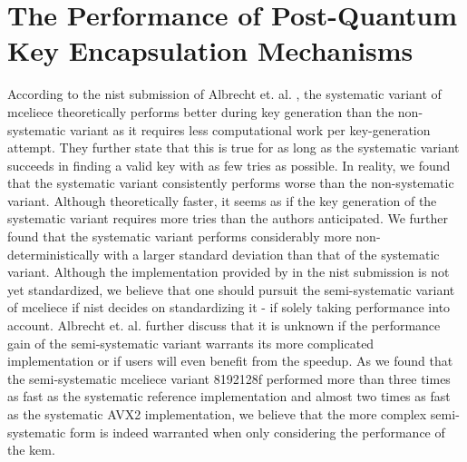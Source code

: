 
\section{The Performance of Post-Quantum Key Encapsulation Mechanisms}

According to the \gls{nist} submission of Albrecht et. al. \cite{mceliece2020}, the systematic variant of \gls{mceliece} theoretically performs better during key generation than the non-systematic variant as it requires less computational work per key-generation attempt. They further state that this is true for as long as the systematic variant succeeds in finding a valid key with as few tries as possible. In reality, we found that the systematic variant consistently performs worse than the non-systematic variant. Although theoretically faster, it seems as if the key generation of the systematic variant requires more tries than the authors anticipated. We further found that the systematic variant performs considerably more non-deterministically with a larger standard deviation than that of the systematic variant. Although the implementation provided by in the \gls{nist} submission is not yet standardized, we believe that one should pursuit the semi-systematic variant of \gls{mceliece} if \gls{nist} decides on standardizing it - if solely taking performance into account. Albrecht et. al. further discuss that it is unknown if the performance gain of the semi-systematic variant warrants its more complicated implementation or if users will even benefit from the speedup. As we found that the semi-systematic \gls{mceliece} variant 8192128f performed more than three times as fast as the systematic reference implementation and almost two times as fast as the systematic AVX2 implementation, we believe that the more complex semi-systematic form is indeed warranted when only considering the performance of the \gls{kem}.

